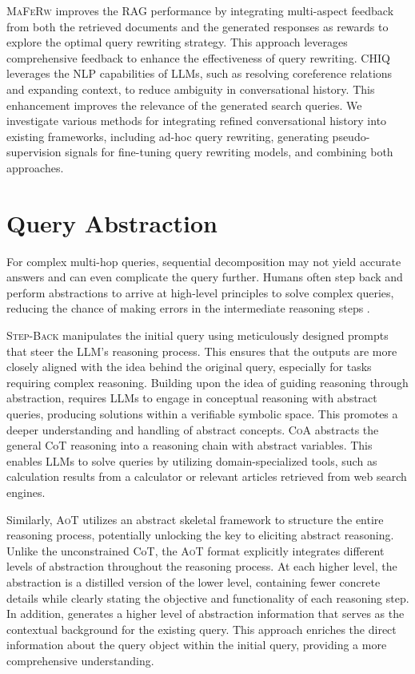 \documentclass[11pt]{article}
\begin{document}
\textsc{MaFeRw} \cite{MaFeRw} improves the RAG performance by integrating multi-aspect feedback from both the retrieved documents and the generated responses as rewards to explore the optimal query rewriting strategy. This approach leverages comprehensive feedback to enhance the effectiveness of query rewriting. \textsc{CHIQ} leverages the NLP capabilities of LLMs, such as resolving coreference relations and expanding context, to reduce ambiguity in conversational history. This enhancement improves the relevance of the generated search queries. We investigate various methods for integrating refined conversational history into existing frameworks, including ad-hoc query rewriting, generating pseudo-supervision signals for fine-tuning query rewriting models, and combining both approaches.

\section{Query Abstraction}\label{Abstraction}
For complex multi-hop queries, sequential decomposition may not yield accurate answers and can even complicate the query further. Humans often step back and perform abstractions to arrive at high-level principles to solve complex queries, reducing the chance of making errors in the intermediate reasoning steps \cite{StepBack}.

\textsc{Step-Back} \cite{StepBack} manipulates the initial query using meticulously designed prompts that steer the LLM's reasoning process. This ensures that the outputs are more closely aligned with the idea behind the original query, especially for tasks requiring complex reasoning.
Building upon the idea of guiding reasoning through abstraction, \cite{Conceptualization-Abstraction} requires LLMs to engage in conceptual reasoning with abstract queries, producing solutions within a verifiable symbolic space. This promotes a deeper understanding and handling of abstract concepts.
\textsc{CoA} \cite{CoA} abstracts the general CoT reasoning into a reasoning chain with abstract variables. This enables LLMs to solve queries by utilizing domain-specialized tools, such as calculation results from a calculator or relevant articles retrieved from web search engines.

Similarly, \textsc{AoT} \cite{AoT} utilizes an abstract skeletal framework to structure the entire reasoning process, potentially unlocking the key to eliciting abstract reasoning. Unlike the unconstrained CoT, the \textsc{AoT} format explicitly integrates different levels of abstraction throughout the reasoning process. At each higher level, the abstraction is a distilled version of the lower level, containing fewer concrete details while clearly stating the objective and functionality of each reasoning step.
In addition, \citet{Crafting-the-Path} generates a higher level of abstraction information that serves as the contextual background for the existing query. This approach enriches the direct information about the query object within the initial query, providing a more comprehensive understanding.
\end{document}
